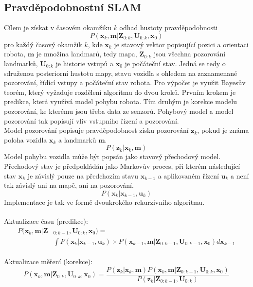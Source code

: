 \documentclass[12pt]{report}
\begin{document}
\subsection{Pravděpodobnostní SLAM}
Cílem je získat v časovém okamžiku $k$ odhad hustoty pravděpodobnosti
\begin{equation}
	P(\textbf{x}_k,\textbf{m}|\textbf{Z}_{0:k},\textbf{U}_{0:k},\textbf{x}_0)
\end{equation}
pro každý časový okamžik ${k}$, kde $\textbf{x}_k$ je stavový vektor popisující pozici a orientaci robota, $\textbf{m}$ je množina landmarů, tedy mapa, $\textbf{Z}_{0:k}$ jsou všechna pozorování landmarků, $\textbf{U}_{0:k}$ je historie vstupů a $\textbf{x}_0$ je počáteční stav. Jedná se tedy o sdruženou posteriorní hustotu mapy, stavu vozidla s ohledem na zaznamenané pozorování, řídící vstupy a  počáteční stav robota. Pro výpočet je využit Bayesův teorém, který vyžaduje rozdělení algoritmu do dvou kroků. Prvním krokem je predikce, která využívá model pohybu robota. Tím druhým je korekce modelu pozorování, ke kterému jsou třeba data ze senzorů. Pohybový model a model pozorování tak popisují vliv vstupního řízení a pozorování.\\
\indent Model pozorování popisuje pravděpodobnost zisku pozorování $\textbf{z}_k$, pokud je známa poloha vozidla $\textbf{x}_k$ a landmarků $\textbf{m}$.
\begin{equation}
	P(\textbf{z}_k|\textbf{x}_k,\textbf{m})
\end{equation} 
\indent Model pohybu vozidla může být popsán jako stavový přechodový model. \\Přechodový stav je předpokládán jako Markovův proces, při kterém následující stav $\textbf{x}_k$ je závislý pouze na předchozím stavu $\textbf{x}_{k-1}$ a aplikovaném řízení $\textbf{u}_k$ a není tak závislý ani na mapě, ani na pozorování.
\begin{equation}
	P(\textbf{x}_k|\textbf{x}_{k-1},\textbf{u}_k)
\end{equation}
Implementace je tak ve formě dvoukrokého rekurzivního algoritmu.\\
\\
Aktualizace času (predikce):
\begin{equation}
	\begin{split}
	P(\textbf{x}_k,\textbf{m}|\textbf{Z}&_{0:k-1},\textbf{U}_{0:k},\textbf{x}_0)=\\&\int P(\textbf{x}_k|\textbf{x}_{k-1},\textbf{u}_k)\times P(\textbf{x}_{k-1},\textbf{m}|\textbf{Z}_{0:k-1},\textbf{U}_{0:k-1},\textbf{x}_0)d\textbf{x}_{k-1}
	\end{split}
\end{equation}
\\
Aktualizace měření (korekce):
\begin{equation}
	P(\textbf{x}_k,\textbf{m}|\textbf{Z}_{0:k},\textbf{U}_{0:k},\textbf{x}_0)=\frac{P(\textbf{z}_k|\textbf{x}_k,\textbf{m})P(\textbf{x}_k,\textbf{m}|\textbf{Z}_{0:k-1},\textbf{U}_{0:k},\textbf{x}_0)}{P(\textbf{z}_k|\textbf{Z}_{0:k-1},\textbf{U}_{0:k})}
\end{equation}
\end{document}
